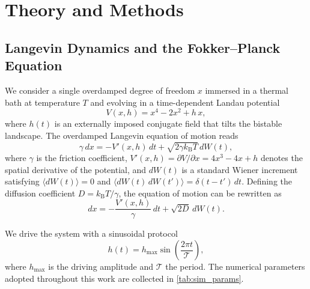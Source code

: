 
\section{Theory and Methods}
\label{sec:methods}

\subsection{Langevin Dynamics and the Fokker--Planck Equation}
\label{sec:langevin}

We consider a single overdamped degree of freedom $x$ immersed in a thermal bath at temperature $T$ and evolving in a time-dependent Landau potential
\begin{equation}
    V(x, h) = x^4 - 2x^2 + h\,x,
    \label{eq:landau_potential}
\end{equation}
where $h(t)$ is an externally imposed conjugate field that tilts the bistable landscape.
The overdamped Langevin equation of motion reads
\begin{equation}
    \gamma\,dx = -V'(x,h)\,dt + \sqrt{2\gamma k_{\mathrm{B}}T}\,dW(t),
    \label{eq:langevin}
\end{equation}
where $\gamma$ is the friction coefficient, $V'(x,h) = \partial V/\partial x = 4x^3 - 4x + h$ denotes the spatial derivative of the potential, and $dW(t)$ is a standard Wiener increment satisfying $\langle dW(t)\rangle = 0$ and $\langle dW(t)\,dW(t')\rangle = \delta(t-t')\,dt$.
Defining the diffusion coefficient $D = k_{\mathrm{B}}T/\gamma$, the equation of motion can be rewritten as
\begin{equation}
    dx = -\frac{V'(x,h)}{\gamma}\,dt + \sqrt{2D}\,dW(t).
    \label{eq:langevin_D}
\end{equation}

We drive the system with a sinusoidal protocol
\begin{equation}
    h(t) = h_{\max}\sin\!\left(\frac{2\pi t}{\mathcal{T}}\right),
    \label{eq:protocol}
\end{equation}
where $h_{\max}$ is the driving amplitude and $\mathcal{T}$ the period.
The numerical parameters adopted throughout this work are collected in \cref{tab:sim_params}.

